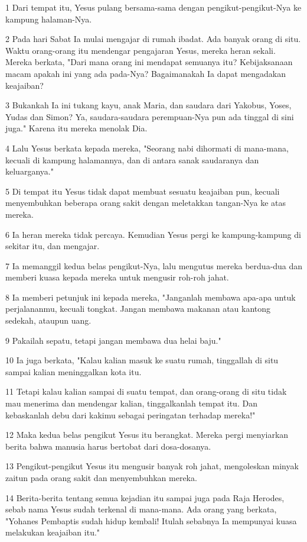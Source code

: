 \par 1 Dari tempat itu, Yesus pulang bersama-sama dengan pengikut-pengikut-Nya ke kampung halaman-Nya.
\par 2 Pada hari Sabat Ia mulai mengajar di rumah ibadat. Ada banyak orang di situ. Waktu orang-orang itu mendengar pengajaran Yesus, mereka heran sekali. Mereka berkata, "Dari mana orang ini mendapat semuanya itu? Kebijaksanaan macam apakah ini yang ada pada-Nya? Bagaimanakah Ia dapat mengadakan keajaiban?
\par 3 Bukankah Ia ini tukang kayu, anak Maria, dan saudara dari Yakobus, Yoses, Yudas dan Simon? Ya, saudara-saudara perempuan-Nya pun ada tinggal di sini juga." Karena itu mereka menolak Dia.
\par 4 Lalu Yesus berkata kepada mereka, "Seorang nabi dihormati di mana-mana, kecuali di kampung halamannya, dan di antara sanak saudaranya dan keluarganya."
\par 5 Di tempat itu Yesus tidak dapat membuat sesuatu keajaiban pun, kecuali menyembuhkan beberapa orang sakit dengan meletakkan tangan-Nya ke atas mereka.
\par 6 Ia heran mereka tidak percaya. Kemudian Yesus pergi ke kampung-kampung di sekitar itu, dan mengajar.
\par 7 Ia memanggil kedua belas pengikut-Nya, lalu mengutus mereka berdua-dua dan memberi kuasa kepada mereka untuk mengusir roh-roh jahat.
\par 8 Ia memberi petunjuk ini kepada mereka, "Janganlah membawa apa-apa untuk perjalananmu, kecuali tongkat. Jangan membawa makanan atau kantong sedekah, ataupun uang.
\par 9 Pakailah sepatu, tetapi jangan membawa dua helai baju."
\par 10 Ia juga berkata, "Kalau kalian masuk ke suatu rumah, tinggallah di situ sampai kalian meninggalkan kota itu.
\par 11 Tetapi kalau kalian sampai di suatu tempat, dan orang-orang di situ tidak mau menerima dan mendengar kalian, tinggalkanlah tempat itu. Dan kebaskanlah debu dari kakimu sebagai peringatan terhadap mereka!"
\par 12 Maka kedua belas pengikut Yesus itu berangkat. Mereka pergi menyiarkan berita bahwa manusia harus bertobat dari dosa-dosanya.
\par 13 Pengikut-pengikut Yesus itu mengusir banyak roh jahat, mengoleskan minyak zaitun pada orang sakit dan menyembuhkan mereka.
\par 14 Berita-berita tentang semua kejadian itu sampai juga pada Raja Herodes, sebab nama Yesus sudah terkenal di mana-mana. Ada orang yang berkata, "Yohanes Pembaptis sudah hidup kembali! Itulah sebabnya Ia mempunyai kuasa melakukan keajaiban itu."
